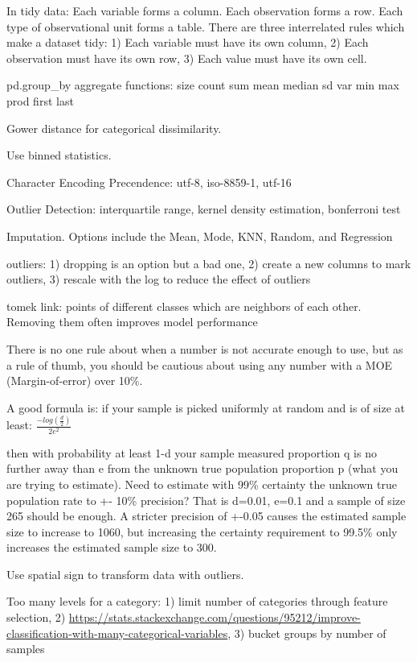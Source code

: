 \documentclass[]{book}
\begin{document}
In tidy data: Each variable forms a column. Each observation forms a row. Each type of observational unit forms a table. There are three interrelated rules which make a dataset tidy: 1) Each variable must have its own column, 2) Each observation must have its own row, 3) Each value must have its own cell.

pd.group\_by aggregate functions: size count sum mean median sd var min max prod first last

Gower distance for categorical dissimilarity.

Use binned statistics.

Character Encoding Precendence: utf-8, iso-8859-1, utf-16

Outlier Detection: interquartile range, kernel density estimation, bonferroni test

Imputation. Options include the Mean, Mode, KNN, Random, and Regression

outliers: 1) dropping is an option but a bad one, 2) create a new columns to mark outliers, 3) rescale with the log to reduce the effect of outliers

tomek link: points of different classes which are neighbors of each other. Removing them often improves model performance

There is no one rule about when a number is not accurate enough to use, but as a rule of thumb, you should be cautious about using any number with a MOE (Margin-of-error) over 10\%.

A good formula is: if your sample is picked uniformly at random and is of size at least: \(\frac{-log(\frac{d}{2})}{2e^2}\)

then with probability at least 1-d your sample measured proportion q is no further away than e from the unknown true population proportion p (what you are trying to estimate). Need to estimate with 99\% certainty the unknown true population rate to +- 10\% precision? That is d=0.01, e=0.1 and a sample of size 265 should be enough. A stricter precision of +-0.05 causes the estimated sample size to increase to 1060, but increasing the certainty requirement to 99.5\% only increases the estimated sample size to 300.

Use spatial sign to transform data with outliers.

Too many levels for a category: 1) limit number of categories through feature selection, 2) \url{https://stats.stackexchange.com/questions/95212/improve-classification-with-many-categorical-variables}, 3) bucket groups by number of samples
\end{document}
